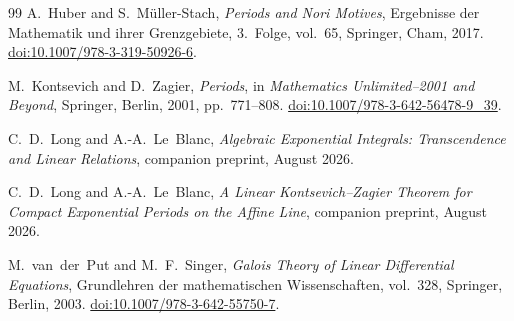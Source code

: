 \documentclass[11pt]{article}
\numberwithin{equation}{section}
\theoremstyle{definition}
\theoremstyle{remark}
\begin{document}
\begin{thebibliography}{99}
A.~Huber and S.~M\"uller-Stach,
\emph{Periods and Nori Motives},
Ergebnisse der Mathematik und ihrer Grenzgebiete, 3.~Folge, vol.~65,
Springer, Cham, 2017.
\href{https://doi.org/10.1007/978-3-319-50926-6}{doi:10.1007/978-3-319-50926-6}.

M.~Kontsevich and D.~Zagier,
\emph{Periods},
in \emph{Mathematics Unlimited--2001 and Beyond},
Springer, Berlin, 2001, pp.~771--808.
\href{https://doi.org/10.1007/978-3-642-56478-9_39}{doi:10.1007/978-3-642-56478-9\_39}.

C.~D.~Long and A.-A.~Le~Blanc,
\emph{Algebraic Exponential Integrals: Transcendence and Linear Relations},
companion preprint, August 2026.

C.~D.~Long and A.-A.~Le~Blanc,
\emph{A Linear Kontsevich--Zagier Theorem for Compact Exponential Periods on
the Affine Line},
companion preprint, August 2026.

M.~van~der~Put and M.~F.~Singer,
\emph{Galois Theory of Linear Differential Equations},
Grundlehren der mathematischen Wissenschaften, vol.~328,
Springer, Berlin, 2003.
\href{https://doi.org/10.1007/978-3-642-55750-7}{doi:10.1007/978-3-642-55750-7}.

\end{thebibliography}
\end{document}
